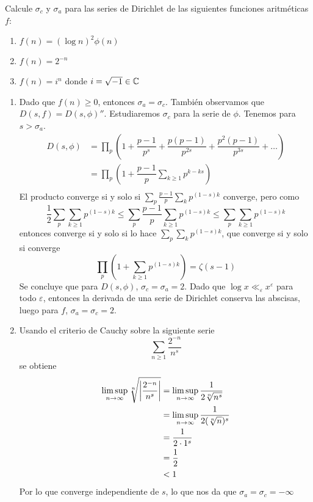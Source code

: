 \begin{prob}[2 pts. c/u]
    Calcule $\sigma_c$ y $\sigma_a$ para las series de Dirichlet de las siguientes funciones aritméticas $f$:
    \begin{enumerate}[label = (\roman*)]
        \item $f(n)=(\log n)^2\phi(n)$

        \item $f(n)=2^{-n}$

        \item $f(n)=i^n$ donde $i=\sqrt{-1}\in\mathbb{C}$
    \end{enumerate}
\end{prob}

\begin{sol}
    \begin{enumerate}[label = (\roman*)]
        \item Dado que $f(n) \geq 0$, entonces $\sigma_a = \sigma_c$. También observamos que $D(s,f) = D(s,\phi)''$. Estudiaremos $\sigma_c$ para la serie de $\phi$. Tenemos para $s > \sigma_a$.
        \begin{align*}
            D(s,\phi) &= \prod_p \left(1 + \dfrac{p-1}{p^s} + \dfrac{p(p-1)}{p^{2s}} + \dfrac{p^2(p-1)}{p^{3s}} + \ldots\right)\\
            &=\prod_p \left(1 + \dfrac{p-1}{p}\sum_{k \geq 1} p^{k-ks}\right)\\
        \end{align*}
        El producto converge si y solo si $\sum_p \frac{p-1}{p}\sum_kp^{(1-s)k}$ converge, pero como
        $$\dfrac{1}{2}\sum_p \sum_{k \geq 1}p^{(1-s)k}\leq\sum_p \dfrac{p-1}{p}\sum_{k\geq 1}p^{(1-s)k} \leq \sum_p \sum_{k \geq 1}p^{(1-s)k}$$
        entonces converge si y solo si lo hace $\sum_p \sum_kp^{(1-s)k}$, que converge si y solo si converge
        $$\prod_p \left(1 + \sum_{k \geq 1}p^{(1-s)k}\right) = \zeta(s-1)$$
        Se concluye que para $D(s,\phi)$, $\sigma_c = \sigma_a = 2$. Dado que $\log x \ll_\varepsilon x^\varepsilon$ para todo $\varepsilon$, entonces la derivada de una serie de Dirichlet conserva las abscisas, luego para $f$, $\sigma_a = \sigma_c = 2$.

        \item Usando el criterio de Cauchy sobre la siguiente serie
        \[\sum_{n\geq 1}\frac{2^{-n}}{n^s}\]
        se obtiene
        \begin{align*}
            \limsup_{n\rightarrow\infty}\sqrt[n]{\left|\frac{2^{-n}}{n^s}\right|}&=\limsup_{n\rightarrow\infty}\frac{1}{2\sqrt[n]{n^s}}\\
            &=\limsup_{n\rightarrow\infty}\frac{1}{2(\sqrt[n]{n})^s}\\
            &=\frac{1}{2\cdot1^s}\\
            &=\frac{1}{2}\\
            &<1
        \end{align*}
        Por lo que converge independiente de $s$, lo que nos da que $\sigma_a=\sigma_c=-\infty$


\end{enumerate}
\end{sol}
